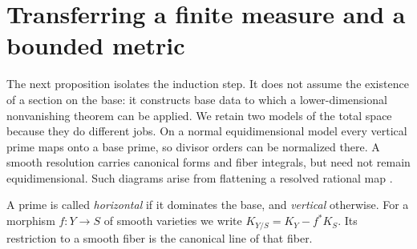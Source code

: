 \section{Transferring a finite measure and a bounded metric}
\label{sec:transfer}

The next proposition isolates the induction step. It does not assume
the existence of a section on the base: it constructs base data to
which a lower-dimensional nonvanishing theorem can be applied.
We retain two models of the total space because they do different jobs.
On a normal equidimensional model every vertical prime maps onto a
base prime, so divisor orders can be normalized there. A smooth
resolution carries canonical forms and fiber integrals, but need not
remain equidimensional. Such diagrams arise from flattening a resolved
rational map \cite{RaynaudGruson1971}.

A prime is called \emph{horizontal} if it dominates the base, and
\emph{vertical} otherwise. For a morphism \(f:Y\to S\) of smooth varieties
we write \(K_{Y/S}=K_Y-f^*K_S\). Its restriction to a smooth fiber is the
canonical line of that fiber.

